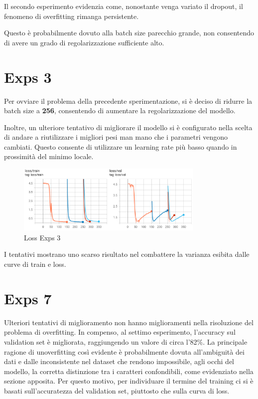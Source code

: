 Il secondo esperimento evidenzia come, nonostante venga variato il dropout, il fenomeno di overfitting rimanga persistente.

Questo è probabilmente dovuto alla batch size parecchio grande, non consentendo di avere un grado di regolarizzazione sufficiente alto.


\section{Exps 3}

Per ovviare il problema della precedente sperimentazione, si è deciso di ridurre la batch size a \textbf{256}, consentendo di aumentare la regolarizzazione del modello.

Inoltre, un ulteriore tentativo di migliorare il modello si è configurato nella scelta di andare a riutilizzare i migliori pesi man mano che i parametri vengono cambiati. Questo consente di utilizzare un learning rate più basso quando in prossimità del minimo locale.

\begin{figure}[htbp]
    \centering
    \includegraphics[width=0.8\textwidth]{images/exps3_loss.png}
    \caption{Loss Exps 3}
    \label{fig:exps1_loss}
\end{figure}

I tentativi mostrano uno scarso risultato nel combattere la varianza esibita dalle curve di train e loss.


\section{Exps 7}

Ulteriori tentativi di miglioramento non hanno miglioramenti nella risoluzione del problema di overfitting. In compenso, al settimo esperimento, l'accuracy sul validation set è migliorata, raggiungendo un valore di circa l'82\%.
La principale ragione di unoverfitting così evidente è probabilmente dovuta all'ambiguità dei dati e dalle inconsistente nel dataset che rendono impossibile, agli occhi del modello, la corretta distinzione tra i caratteri confondibili, come evidenziato nella sezione apposita. Per questo motivo, per individuare il termine del training ci si è basati sull'accuratezza del validation set, piuttosto che sulla curva di loss.

